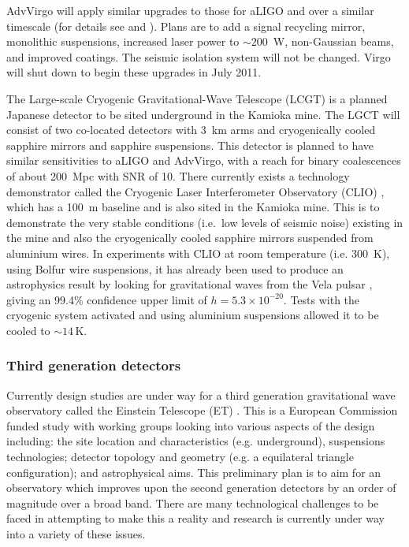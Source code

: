 \documentclass{article}
\begin{document}
AdvVirgo will apply similar upgrades to those for aLIGO and over a similar
timescale (for details see \cite{AdVwhitepaper} and \cite{AdVdesign}). Plans are
to add a signal recycling mirror, monolithic suspensions, increased laser power
to $\sim200$~W, non-Gaussian beams, and improved coatings. The seismic isolation
system will not be changed. Virgo will shut down to begin these upgrades in July
2011.

The Large-scale Cryogenic Gravitational-Wave Telescope (LCGT)
\cite{Miyoki:2005, Ohashi:2008} is a planned Japanese detector to be sited
underground in the Kamioka mine. The LGCT will consist of two co-located
detectors with 3~km arms and cryogenically cooled sapphire mirrors and sapphire
suspensions. This detector is planned to have similar sensitivities to aLIGO
and AdvVirgo, with a reach for binary coalescences of about 200~Mpc with SNR of
10. There currently exists a technology demonstrator called the Cryogenic Laser
Interferometer Observatory (CLIO) \cite{Yamamoto:2008, CLIOweb}, which has a
100~m baseline and is also sited in the Kamioka mine. This is to demonstrate the
very stable conditions (i.e.\ low levels of seismic noise) existing in the mine
and also the cryogenically cooled sapphire mirrors suspended from aluminium
wires. In experiments with CLIO at room temperature (i.e. 300~K), using Bolfur
wire suspensions, it has already been used to produce an astrophysics result by
looking for gravitational waves from the Vela pulsar \cite{Akutsu:2008}, giving
an 99.4\% confidence upper limit of $h = 5.3\times10^{-20}$. Tests with the
cryogenic system activated and using aluminium suspensions allowed it to be cooled to
$\sim14$\,K.

\subsubsection{Third generation detectors}
Currently design studies are under way for a third generation gravitational wave
observatory called the Einstein Telescope (ET) \cite{ETweb}. This is a European
Commission funded study with working groups looking into various aspects of the
design including: the site location and characteristics (e.g. underground),
suspensions technologies; detector topology and geometry (e.g. a equilateral
triangle configuration); and astrophysical aims. This preliminary plan is to
aim for an observatory which improves upon the second generation detectors by
an order of magnitude over a broad band. There are many technological
challenges to be faced in attempting to make this a reality and research is
currently under way into a variety of these issues.
\end{document}
